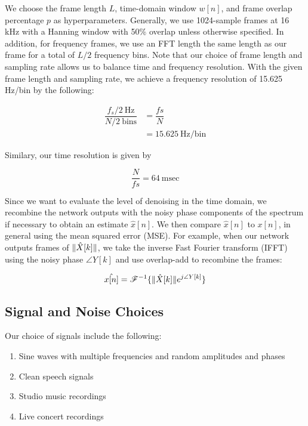 We choose the frame length $L$, time-domain window $w[n]$, and frame overlap percentage $p$ as hyperparameters. Generally, we use 1024-sample frames at 16 kHz with a Hanning window with 50\% overlap unless otherwise specified. In addition, for frequency frames, we use an FFT length the same length as our frame for a total of $L/2$ frequency bins. Note that our choice of frame length and sampling rate allows us to balance time and frequency resolution. With the given frame length and sampling rate, we achieve a frequency resolution of 15.625 Hz/bin by the following:

\begin{align}
\dfrac{f_s/2 \:\text{Hz}}{N/2 \:\text{bins}} &= \dfrac{fs}{N}\\
&= 15.625 \:\text{Hz/bin}
\end{align}

Similary, our time resolution is given by

\begin{equation}
\dfrac{N}{fs} = 64 \:\text{msec}
\end{equation}

Since we want to evaluate the level of denoising in the time domain, we recombine the network outputs with the noisy phase components of the spectrum if necessary to obtain an estimate $\hat{x}[n]$. We then compare $\hat{x}[n]$ to $x[n]$, in general using the mean squared error (MSE). For example, when our network outputs frames of $\lVert\hat{X}[k]\rVert$, we take the inverse Fast Fourier transform (IFFT) using the noisy phase $\angle{Y[k]}$ and use overlap-add to recombine the frames:

\begin{equation}
\hat{x[n]} = \mathscr{F}^{-1} \{ \lVert\hat{X}[k]\rVert e^{j \angle{Y[k]}} \}
\end{equation}

\subsection{Signal and Noise Choices}
Our choice of signals include the following:

\begin{enumerate}
    \item Sine waves with multiple frequencies and random amplitudes and phases
    \item Clean speech signals
    \item Studio music recordings
    \item Live concert recordings
\end{enumerate}

